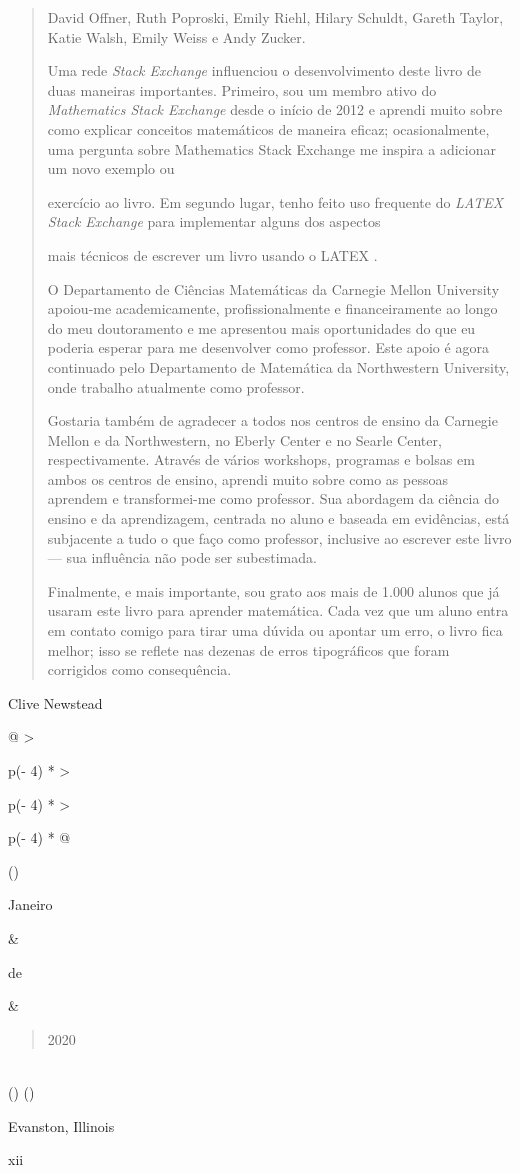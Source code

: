 \documentclass[
]{article}
\begin{document}
\begin{quote}
David Offner, Ruth Poproski, Emily Riehl, Hilary Schuldt, Gareth Taylor,
Katie Walsh, Emily Weiss e Andy Zucker.

Uma rede \emph{Stack Exchange} influenciou o desenvolvimento deste livro
de duas maneiras importantes. Primeiro, sou um membro ativo do
\emph{Mathematics Stack Exchange} desde o início de 2012 e aprendi muito
sobre como explicar conceitos matemáticos de maneira eficaz;
ocasionalmente, uma pergunta sobre Mathematics Stack Exchange me inspira
a adicionar um novo exemplo ou

exercício ao livro. Em segundo lugar, tenho feito uso frequente do
\emph{LATEX Stack Exchange} para implementar alguns dos aspectos

mais técnicos de escrever um livro usando o LATEX .

O Departamento de Ciências Matemáticas da Carnegie Mellon University
apoiou-me academicamente, profissionalmente e financeiramente ao longo
do meu doutoramento e me apresentou mais oportunidades do que eu poderia
esperar para me desenvolver como professor. Este apoio é agora
continuado pelo Departamento de Matemática da Northwestern University,
onde trabalho atualmente como professor.

Gostaria também de agradecer a todos nos centros de ensino da Carnegie
Mellon e da Northwestern, no Eberly Center e no Searle Center,
respectivamente. Através de vários workshops, programas e bolsas em
ambos os centros de ensino, aprendi muito sobre como as pessoas aprendem
e transformei-me como professor. Sua abordagem da ciência do ensino e da
aprendizagem, centrada no aluno e baseada em evidências, está subjacente
a tudo o que faço como professor, inclusive ao escrever este livro ---
sua influência não pode ser subestimada.

Finalmente, e mais importante, sou grato aos mais de 1.000 alunos que já
usaram este livro para aprender matemática. Cada vez que um aluno entra
em contato comigo para tirar uma dúvida ou apontar um erro, o livro fica
melhor; isso se reflete nas dezenas de erros tipográficos que foram
corrigidos como consequência.
\end{quote}

Clive Newstead

\begin{longtable}[]{@{}
  >{\raggedright\arraybackslash}p{(\columnwidth - 4\tabcolsep) * }
  >{\raggedright\arraybackslash}p{(\columnwidth - 4\tabcolsep) * }
  >{\raggedright\arraybackslash}p{(\columnwidth - 4\tabcolsep) * }@{}}
\toprule()
\begin{minipage}[b]{\linewidth}\raggedright
Janeiro
\end{minipage} & \begin{minipage}[b]{\linewidth}\raggedright
de
\end{minipage} & \begin{minipage}[b]{\linewidth}\raggedright
\begin{quote}
2020
\end{quote}
\end{minipage} \\
\midrule()
\endhead
\bottomrule()
\end{longtable}

Evanston, Illinois

xii
\end{document}
